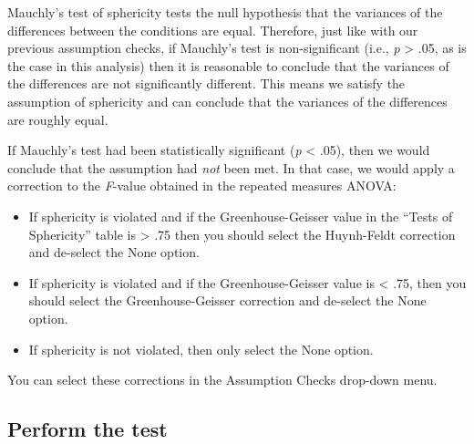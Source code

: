 \documentclass[
]{book}
\providecommand{\tightlist}{%
  \setlength{\itemsep}{0pt}\setlength{\parskip}{0pt}}
\begin{document}
Mauchly's test of sphericity tests the null hypothesis that the variances of the differences between the conditions are equal. Therefore, just like with our previous assumption checks, if Mauchly's test is non-significant (i.e., \emph{p} \textgreater{} .05, as is the case in this analysis) then it is reasonable to conclude that the variances of the differences are not significantly different. This means we satisfy the assumption of sphericity and can conclude that the variances of the differences are roughly equal.

If Mauchly's test had been statistically significant (\emph{p} \textless{} .05), then we would conclude that the assumption had \emph{not} been met. In that case, we would apply a correction to the \emph{F}-value obtained in the repeated measures ANOVA:

\begin{itemize}
\tightlist
\item
  If sphericity is violated and if the Greenhouse-Geisser value in the ``Tests of Sphericity'' table is \textgreater{} .75 then you should select the Huynh-Feldt correction and de-select the None option.
\item
  If sphericity is violated and if the Greenhouse-Geisser value is \textless{} .75, then you should select the Greenhouse-Geisser correction and de-select the None option.
\item
  If sphericity is not violated, then only select the None option.
\end{itemize}

You can select these corrections in the Assumption Checks drop-down menu.

\hypertarget{perform-the-test-7}{%
\subsection{Perform the test}\label{perform-the-test-7}}
\end{document}

